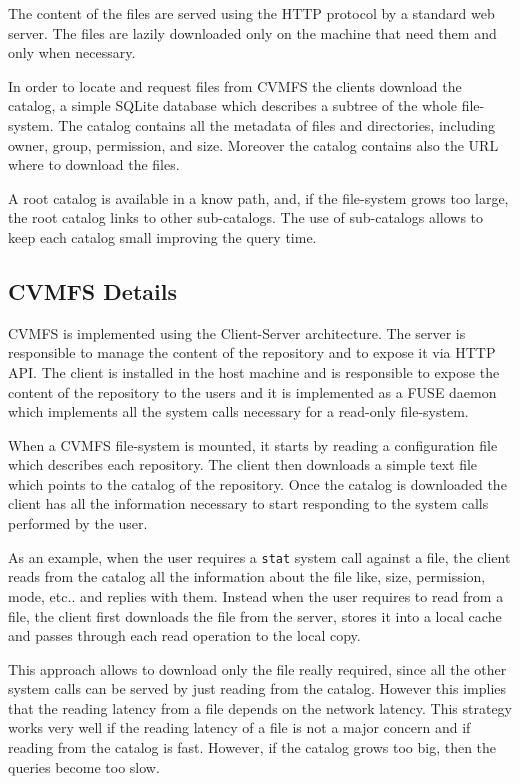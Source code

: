 The content of the files are served using the HTTP protocol by a standard
web server. The files are lazily downloaded only on the machine that need them
and only when necessary.

In order to locate and request files from CVMFS the clients download the
catalog, a simple SQLite database which describes a subtree of the whole
file-system.  The catalog contains all the metadata of files and directories,
including owner, group, permission, and size. Moreover the catalog contains
also the URL where to download the files.

A root catalog is available in a know path, and, if the file-system grows too
large, the root catalog links to other sub-catalogs. The use of sub-catalogs
allows to keep each catalog small improving the query time.

\subsection{CVMFS Details}

CVMFS is implemented using the Client-Server architecture. The server is
responsible to manage the content of the repository and to expose it via HTTP API.
The client is installed in the host machine and is responsible to expose the
content of the repository to the users and it is implemented as a FUSE
daemon which implements all the system calls necessary for a read-only
file-system. 

When a CVMFS file-system is mounted, it starts by reading a configuration file
which describes each repository. The client then downloads a simple text
file which points to the catalog of the repository. Once the catalog is
downloaded the client has all the information necessary to start responding to
the system calls performed by the user.

As an example, when the user requires a \texttt{stat} system call against a
file, the client reads from the catalog all the information about the file like,
size, permission, mode, etc.. and replies with them. Instead when the user requires to read from a file, the client first downloads the
file from the server, stores it into a local cache and passes through each read
operation to the local copy.

This approach allows to download only the file really required, since all the
other system calls can be served by just reading from the catalog. However this
implies that the reading latency from a file depends on the network latency.
This strategy works very well if the reading latency of a file is not a major
concern and if reading from the catalog is fast. However, if the catalog grows
too big, then the queries become too slow. 

